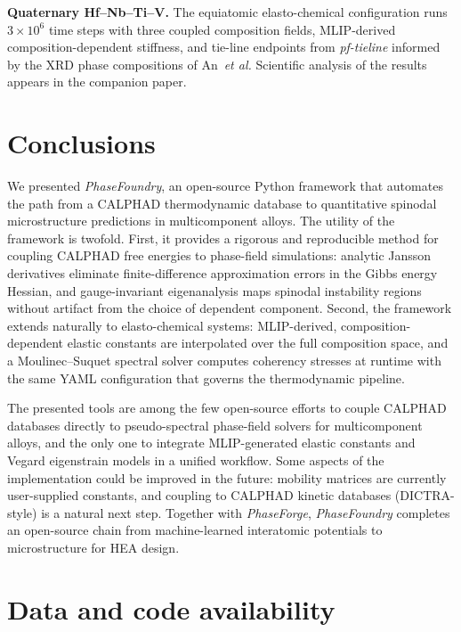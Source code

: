 \documentclass[12pt]{article}
\begin{document}
\textbf{Quaternary Hf--Nb--Ti--V.} The equiatomic elasto-chemical configuration runs $3 \times 10^6$ time steps with three coupled composition fields, MLIP-derived composition-dependent stiffness, and tie-line endpoints from \emph{pf-tieline} informed by the XRD phase compositions of An~\textit{et al.}\cite{an2021spinodal} Scientific analysis of the results appears in the companion paper.\cite{kunselman2025spinodal}


\section{Conclusions}

We presented \textit{PhaseFoundry}, an open-source Python framework that automates the path from a CALPHAD thermodynamic database to quantitative spinodal microstructure predictions in multicomponent alloys. The utility of the framework is twofold. First, it provides a rigorous and reproducible method for coupling CALPHAD free energies to phase-field simulations: analytic Jansson derivatives eliminate finite-difference approximation errors in the Gibbs energy Hessian, and gauge-invariant eigenanalysis maps spinodal instability regions without artifact from the choice of dependent component. Second, the framework extends naturally to elasto-chemical systems: MLIP-derived, composition-dependent elastic constants are interpolated over the full composition space, and a Moulinec--Suquet spectral solver computes coherency stresses at runtime with the same YAML configuration that governs the thermodynamic pipeline.

The presented tools are among the few open-source efforts to couple CALPHAD databases directly to pseudo-spectral phase-field solvers for multicomponent alloys, and the only one to integrate MLIP-generated elastic constants and Vegard eigenstrain models in a unified workflow. Some aspects of the implementation could be improved in the future: mobility matrices are currently user-supplied constants, and coupling to CALPHAD kinetic databases (DICTRA-style) is a natural next step. Together with \textit{PhaseForge}, \textit{PhaseFoundry} completes an open-source chain from machine-learned interatomic potentials to microstructure for HEA design.

\section*{Data and code availability}
\end{document}
